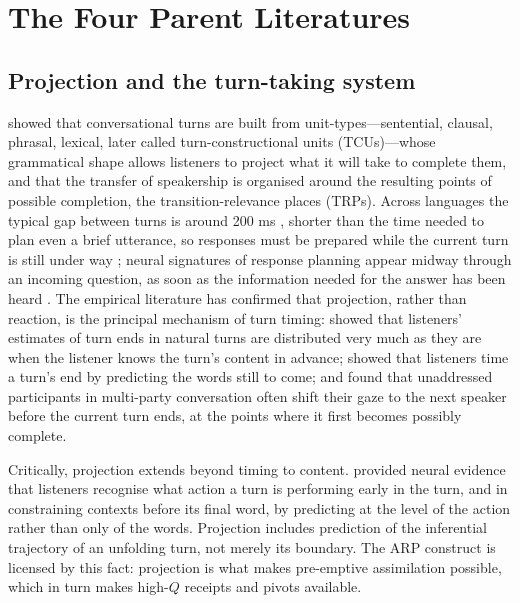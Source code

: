 \section{The Four Parent Literatures}\label{sec:background}

\subsection{Projection and the turn-taking system}

\citet{Sacks1974} showed that conversational turns are built from unit-types---sentential, clausal, phrasal, lexical, later called turn-constructional units (TCUs)---whose grammatical shape allows listeners to project what it will take to complete them, and that the transfer of speakership is organised around the resulting points of possible completion, the transition-relevance places (TRPs). Across languages the typical gap between turns is around 200 ms \citep{Stivers2009}, shorter than the time needed to plan even a brief utterance, so responses must be prepared while the current turn is still under way \citep{Levinson2016}; neural signatures of response planning appear midway through an incoming question, as soon as the information needed for the answer has been heard \citep{Bogels2015}. The empirical literature has confirmed that projection, rather than reaction, is the principal mechanism of turn timing: \citet{Riest2015} showed that listeners' estimates of turn ends in natural turns are distributed very much as they are when the listener knows the turn's content in advance; \citet{MagyariDeRuiter2012} showed that listeners time a turn's end by predicting the words still to come; and \citet{HollerKendrick2015} found that unaddressed participants in multi-party conversation often shift their gaze to the next speaker before the current turn ends, at the points where it first becomes possibly complete.

Critically, projection extends beyond timing to content. \citet{Gisladottir2015} provided neural evidence that listeners recognise what action a turn is performing early in the turn, and in constraining contexts before its final word, by predicting at the level of the action rather than only of the words. Projection includes prediction of the inferential trajectory of an unfolding turn, not merely its boundary. The ARP construct is licensed by this fact: projection is what makes pre-emptive assimilation possible, which in turn makes high-$Q$ receipts and pivots available.

